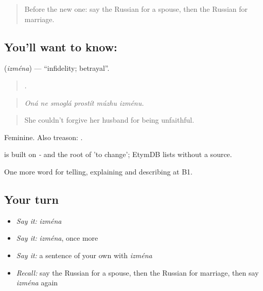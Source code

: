 \label{lesson:RU-C494-izmena}



\begin{quote}
Before the new one: say the Russian for a spouse, then the Russian for marriage.
\end{quote}

\subsection*{You'll want to know: }
\textbf{} (\emph{izména}) — \textquotedblleft{}infidelity; betrayal\textquotedblright{}.

\begin{quote}
     .
\end{quote}

\begin{quote}
\emph{Oná ne smoglá prostít múzhu izménu.}
\end{quote}

\begin{quote}
She couldn't forgive her husband for being unfaithful.
\end{quote}

Feminine. Also treason: \emph{ }.

\begin{cousinweb}
\emph{} is built on \emph{-} and the root of \emph{} 'to change'; EtymDB lists \emph{} without a source.
\end{cousinweb}

\begin{grammarlens}[title={What you've built}]
One more word for telling, explaining and describing at B1.
\end{grammarlens}

\subsection*{Your turn}
\begin{itemize}
\raggedright
  \item \emph{Say it:} \emph{izména}
  \item \emph{Say it:} \emph{izména}, once more
  \item \emph{Say it:} a sentence of your own with \emph{izména}
  \item \emph{Recall:} say the Russian for a spouse, then the Russian for marriage, then say \emph{izména} again
\end{itemize}

